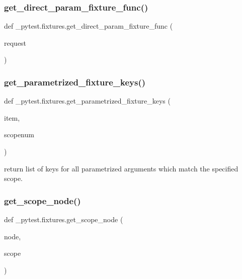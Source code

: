 \subsubsection{\texorpdfstring{get\+\_\+direct\+\_\+param\+\_\+fixture\+\_\+func()}{get\_direct\_param\_fixture\_func()}}
{\footnotesize\ttfamily def \+\_\+pytest.\+fixtures.\+get\+\_\+direct\+\_\+param\+\_\+fixture\+\_\+func (\begin{DoxyParamCaption}\item[{}]{request }\end{DoxyParamCaption})}

\mbox{\label{namespace__pytest_1_1fixtures_a726d8a513109c1b11172bf9dc9a6608b}} 
\subsubsection{\texorpdfstring{get\+\_\+parametrized\+\_\+fixture\+\_\+keys()}{get\_parametrized\_fixture\_keys()}}
{\footnotesize\ttfamily def \+\_\+pytest.\+fixtures.\+get\+\_\+parametrized\+\_\+fixture\+\_\+keys (\begin{DoxyParamCaption}\item[{}]{item,  }\item[{}]{scopenum }\end{DoxyParamCaption})}

\begin{DoxyVerb}return list of keys for all parametrized arguments which match
the specified scope. \end{DoxyVerb}
 \mbox{\label{namespace__pytest_1_1fixtures_a214e840e7e5ebbe2333e4880664a148f}} 
\subsubsection{\texorpdfstring{get\+\_\+scope\+\_\+node()}{get\_scope\_node()}}
{\footnotesize\ttfamily def \+\_\+pytest.\+fixtures.\+get\+\_\+scope\+\_\+node (\begin{DoxyParamCaption}\item[{}]{node,  }\item[{}]{scope }\end{DoxyParamCaption})}

